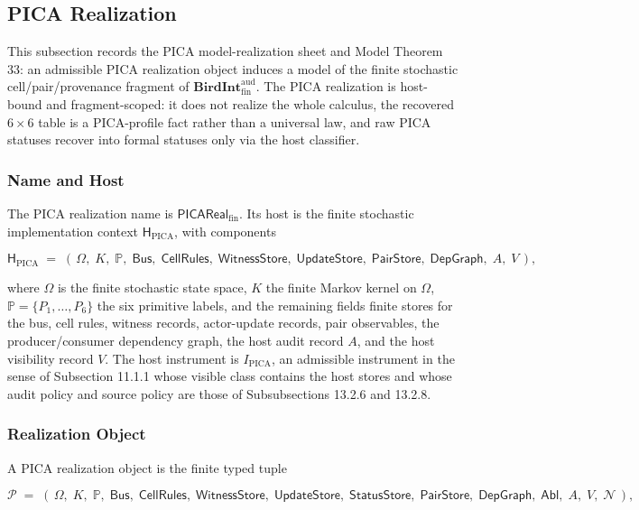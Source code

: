 \documentclass[11pt]{article}
\theoremstyle{definition}
\begin{document}
\subsection{PICA Realization}

This subsection records the PICA model-realization sheet and Model Theorem 33: an admissible PICA realization object induces a model of the finite stochastic cell/pair/provenance fragment of \(\mathbf{BirdInt}^{\mathrm{aud}}_{\mathrm{fin}}\). The PICA realization is host-bound and fragment-scoped: it does not realize the whole calculus, the recovered \(6\times 6\) table is a PICA-profile fact rather than a universal law, and raw PICA statuses recover into formal statuses only via the host classifier.

\subsubsection{Name and Host}

The PICA realization name is \(\mathsf{PICAReal}_{\mathrm{fin}}\). Its host is the finite stochastic implementation context \(\mathsf H_{\mathrm{PICA}}\), with components

\[
\mathsf H_{\mathrm{PICA}}\;=\;(\,\Omega,\;K,\;\mathbb P,\;\mathsf{Bus},\;\mathsf{CellRules},\;\mathsf{WitnessStore},\;\mathsf{UpdateStore},\;\mathsf{PairStore},\;\mathsf{DepGraph},\;A,\;V\,),
\]

where \(\Omega\) is the finite stochastic state space, \(K\) the finite Markov kernel on \(\Omega\), \(\mathbb P=\{P_1,\ldots,P_6\}\) the six primitive labels, and the remaining fields finite stores for the bus, cell rules, witness records, actor-update records, pair observables, the producer/consumer dependency graph, the host audit record \(A\), and the host visibility record \(V\). The host instrument is \(I_{\mathrm{PICA}}\), an admissible instrument in the sense of Subsection 11.1.1 whose visible class contains the host stores and whose audit policy and source policy are those of Subsubsections 13.2.6 and 13.2.8.

\subsubsection{Realization Object}

A PICA realization object is the finite typed tuple

\[
\mathcal P\;=\;(\,\Omega,\;K,\;\mathbb P,\;\mathsf{Bus},\;\mathsf{CellRules},\;\mathsf{WitnessStore},\;\mathsf{UpdateStore},\;\mathsf{StatusStore},\;\mathsf{PairStore},\;\mathsf{DepGraph},\;\mathsf{Abl},\;A,\;V,\;\mathcal N\,),
\]
\end{document}
